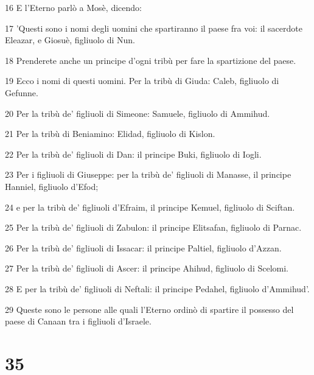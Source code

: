 \par 16 E l'Eterno parlò a Mosè, dicendo:
\par 17 'Questi sono i nomi degli uomini che spartiranno il paese fra voi: il sacerdote Eleazar, e Giosuè, figliuolo di Nun.
\par 18 Prenderete anche un principe d'ogni tribù per fare la spartizione del paese.
\par 19 Ecco i nomi di questi uomini. Per la tribù di Giuda: Caleb, figliuolo di Gefunne.
\par 20 Per la tribù de' figliuoli di Simeone: Samuele, figliuolo di Ammihud.
\par 21 Per la tribù di Beniamino: Elidad, figliuolo di Kislon.
\par 22 Per la tribù de' figliuoli di Dan: il principe Buki, figliuolo di Iogli.
\par 23 Per i figliuoli di Giuseppe: per la tribù de' figliuoli di Manasse, il principe Hanniel, figliuolo d'Efod;
\par 24 e per la tribù de' figliuoli d'Efraim, il principe Kemuel, figliuolo di Sciftan.
\par 25 Per la tribù de' figliuoli di Zabulon: il principe Elitsafan, figliuolo di Parnac.
\par 26 Per la tribù de' figliuoli di Issacar: il principe Paltiel, figliuolo d'Azzan.
\par 27 Per la tribù de' figliuoli di Ascer: il principe Ahihud, figliuolo di Scelomi.
\par 28 E per la tribù de' figliuoli di Neftali: il principe Pedahel, figliuolo d'Ammihud'.
\par 29 Queste sono le persone alle quali l'Eterno ordinò di spartire il possesso del paese di Canaan tra i figliuoli d'Israele.

\chapter{35}

